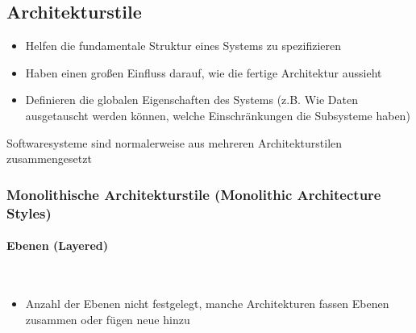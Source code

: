 \documentclass[
    ngerman,
    color=3b,
    summary,
    boxarc,
    main,
]{rubos-tuda-template}
\begin{document}
\subsection{Architekturstile}
\begin{itemize}
    \item Helfen die fundamentale Struktur eines Systems zu spezifizieren
    \item Haben einen großen Einfluss darauf, wie die fertige Architektur aussieht
    \item Definieren die globalen Eigenschaften des Systems (z.B. Wie Daten ausgetauscht werden können, welche Einschränkungen die Subsysteme haben)
\end{itemize}
Softwaresysteme sind normalerweise aus mehreren Architekturstilen zusammengesetzt
\clearpage
\subsubsection{Monolithische Architekturstile (Monolithic Architecture Styles)}
\paragraph{Ebenen (Layered)}\mbox{}\\
\begin{figure}[h]
    \centering
\end{figure}
\FloatBarrier
\begin{itemize}
    \item Anzahl der Ebenen nicht festgelegt, manche Architekturen fassen Ebenen zusammen oder fügen neue hinzu
\end{itemize}
\end{document}
